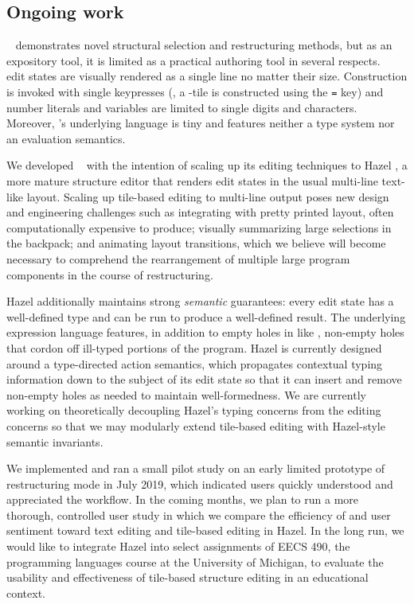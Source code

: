 \subsection{Ongoing work}

\tylr~ demonstrates novel structural selection and restructuring
methods, but as an expository tool, it is limited
as a practical authoring tool in several respects.
\tylr~ edit states are visually rendered as a single line
no matter their size.
Construction is invoked with single keypresses (\eg,
a -tile is constructed using the \texttt{=} key)
and number literals and variables are limited to
single digits and characters.
Moreover, \tylr's underlying language is tiny and
features neither a type system nor an evaluation semantics.

We developed \tylr~ with the intention of scaling up
its editing techniques to Hazel ,
a more mature structure editor that renders
edit states in the usual multi-line text-like layout.
Scaling up tile-based editing to multi-line output
poses new design and engineering challenges
such as integrating with pretty printed layout,
often computationally expensive to produce;
visually summarizing large selections in the backpack;
and animating layout transitions, which
we believe will become necessary to
comprehend the rearrangement of multiple large program
components in the course of restructuring.

Hazel additionally maintains strong
\emph{semantic} guarantees: every edit state
has a well-defined type and can be run to
produce a well-defined result.
The underlying expression language features, in
addition to empty holes in like \tylr, non-empty
holes that cordon off ill-typed portions
of the program.
Hazel is currently designed around
a type-directed action semantics, which
propagates contextual typing information
down to the subject of its edit state
so that it can insert and remove non-empty holes
as needed to maintain well-formedness.
We are currently working on theoretically decoupling
Hazel's typing concerns from the editing concerns
so that we may modularly extend tile-based editing
with Hazel-style semantic invariants.

We implemented and ran a small pilot study on an early limited
prototype of restructuring mode in July 2019, which indicated
users quickly understood and appreciated the workflow.
In the coming months, we plan to run a more thorough, controlled user study in which
we compare the efficiency of and user sentiment
toward text editing and tile-based editing in Hazel.
In the long run, we would like to integrate Hazel into
select assignments of EECS 490, the programming languages
course at the University of Michigan, to evaluate the
usability and effectiveness of tile-based structure editing
in an educational context.
